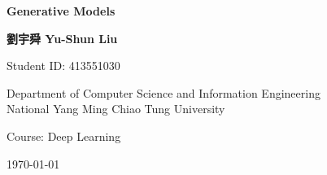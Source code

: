 \begin{titlepage}
    \begin{center}
        \vspace*{2cm}
        
        \Huge
        \textbf{Generative Models}
        
        \vspace{1.5cm}
        
        \Large
        \textbf{劉宇舜 Yu-Shun Liu}
        
        \vspace{1cm}
        
        \large
        Student ID: 413551030
        
        \vspace{2cm}
        
        \large
        Department of Computer Science and Information Engineering\\
        National Yang Ming Chiao Tung University
        
        \vspace{1cm}
        
        \large
        Course: Deep Learning
        
        \vspace{1cm}
        
        \large
        \today
        
    \end{center}
\end{titlepage} 
